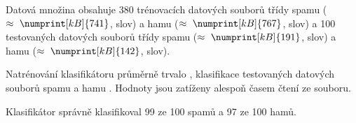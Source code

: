 \documentclass[a4paper, 12pt]{report}
\begin{document}
Datová množina obsahuje 380 trénovacích datových souborů třídy spamu ($\approx~\numprint[kB]{741}$,  slov) a hamu ($\approx~\numprint[kB]{767}$,  slov) a 
100 testovaných datových souborů třídy spamu ($\approx~\numprint[kB]{191}$,  slov) a hamu ($\approx~\numprint[kB]{142}$,  slov).

Natrénování klasifikátoru průměrně trvalo , 
klasifikace testovaných datových souborů spamu  a hamu 
. Hodnoty jsou zatíženy alespoň časem čtení ze souboru.

Klasifikátor správně klasifikoval 99 ze 100 spamů a 97 ze 100 hamů.
\end{document}
